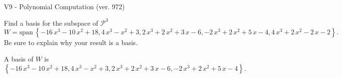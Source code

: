 \begin{exercise}
  \begin{exerciseTitle}V9 - Polynomial Computation (ver. 972)\end{exerciseTitle}
  \begin{exerciseStatement}
    Find a basis for the subspace of \(\mathcal{P}^3\) 
\[W=\mathrm{span}\ \left\{-16 \, x^{3} - 10 \, x^{2} + 18 , 4 \, x^{3} - x^{2} + 3 , 2 \, x^{3} + 2 \, x^{2} + 3 \, x - 6 , -2 \, x^{3} + 2 \, x^{2} + 5 \, x - 4 , 4 \, x^{3} + 2 \, x^{2} - 2 \, x - 2\right\}.\]
 Be sure to explain why your result is a basis.


  \end{exerciseStatement}
  \begin{exerciseAnswer}
   A basis of \(W\) is  \(\left\{-16 \, x^{3} - 10 \, x^{2} + 18 , 4 \, x^{3} - x^{2} + 3 , 2 \, x^{3} + 2 \, x^{2} + 3 \, x - 6 , -2 \, x^{3} + 2 \, x^{2} + 5 \, x - 4\right\}\).
  


  \end{exerciseAnswer}
\end{exercise}